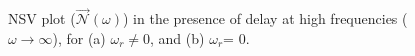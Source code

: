 \begin{comment}
\begin{figure}
		\centering
		\begin{subfigure}[b]{0.5\textwidth}
			\centering
			\texttt{[image: Figures/wr\_0\_v5.eps]}
			\caption{$\omega_r\neq0$}
			\label{fig:Nx=0}
		\end{subfigure}%
		
		~ %
\begin{subfigure}[b]{0.5\textwidth}
			\centering
			\texttt{[image: Figures/wr\_neq0\_v5.eps]}
   \centering
			\caption{$\omega_r=0$}
			\label{fig:nxny=0}
		\end{subfigure}
		\caption{NSV plot ($\stackrel{\rightarrow}{\mathcal{N}}(\omega)$) in the presence of delay at high frequencies.}
		\label{fig:NSV delay}
	\end{figure}
\end{comment}


    \begin{figure}[!t]
\centering
{}
{}%
\label{fig:nxny=0}
\caption{NSV plot ($\stackrel{\rightarrow}{\mathcal{N}}(\omega)$) in the presence of delay at high frequencies ($\omega \rightarrow \infty$), for (a) $\omega_r\neq 0$, and (b) $\omega_r$= 0.}
\label{fig:NSV delay}
\end{figure}